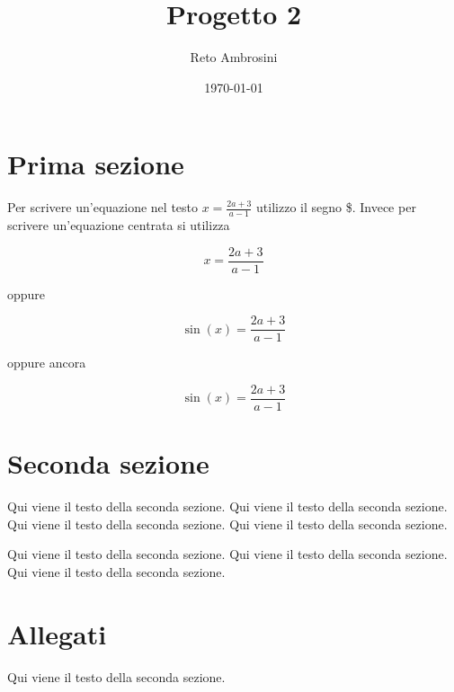 \documentclass[a4paper,12pt]{scrartcl}
\title{Progetto 2}
\author{Reto Ambrosini}
\date{\today}
\begin{document}
	
	\maketitle
	
\newpage

	\tableofcontents

\newpage

\section{Prima sezione}

Per scrivere un'equazione nel testo $ x=\frac{2a+3}{a-1} $ utilizzo il segno \$.
Invece per scrivere un'equazione centrata si utilizza

\[ x=\frac{2a+3}{a-1} \]

oppure

$$ \sin(x)=\frac{2a+3}{a-1} $$

oppure ancora

\begin{equation}
	\sin(x)=\frac{2a+3}{a-1} 
\end{equation}


\section[Due]{Seconda sezione}
	
Qui viene il testo della seconda sezione.
Qui viene il testo della seconda sezione.
Qui viene il testo della seconda sezione.
Qui viene il testo della seconda sezione.

\vspace{2mm}
Qui viene il testo della seconda sezione.
Qui viene il testo della seconda sezione.
Qui viene il testo della seconda sezione.


\section*{Allegati}

Qui viene il testo della seconda sezione.

\end{document}

